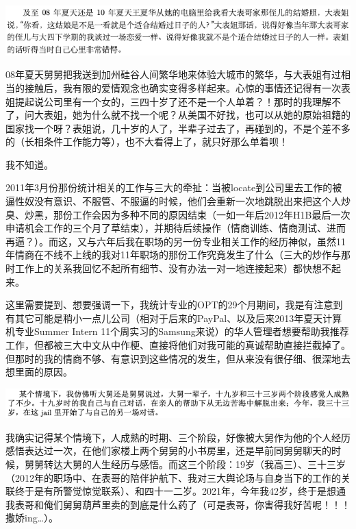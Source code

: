 \documentclass[9pt, b5paper]{article}
\begin{document}
\begin{center}
\includegraphics[width=.9\linewidth]{./pic/pfp53.png}
\end{center}

08年夏天舅舅把我送到加州硅谷人间繁华地来体验大城市的繁华，与大表姐有过相当的接触后，我有限的爱情观念也确实变得多样起来。心惊的事情还记得有一次表姐提起说公司里有一个女的，三四十岁了还不是一个人单着？！那时的我理解不了，问大表姐，她为什么就不找一个呢？从美国不好找，也可以从她的原始祖籍的国家找一个呀？表姐说，几十岁的人了，半辈子过去了，再碰到的，不是个差不多的（长相条件工作能力等），也不大看得上了，就只好那么单着呗！

我不知道。

2011年3月份那份统计相关的工作与三大的牵扯：当被locate到公司里去工作的被逼性奴没有意识、不服管、不服逼的时候，他们会重新一次地跳脱出来把这个人炒臭、炒黑，那份工作会因为多种不同的原因结束（一如一年后2012年H1B最后一次申请机会工作的三个月了草结束），并期待后续操作（情商训练、情商测试、进而再逼？）。而这，又与六年后我在职场的另一份专业相关工作的经历神似，虽然11年情商在不线不上线的我对11年职场的那份工作究竟发生了什么（三大的炒作与那时工作上的关系我回忆不起所有细节、没有办法一对一地连接起来）都快想不起来。 

这里需要提到、想要强调一下，我统计专业的OPT的29个月期间，我是有注意到有其它可能是稍小一点儿公司（相对于后来的PayPal、以及后来2013年夏天计算机专业Summer Intern 11个周实习的Samsung来说）的华人管理者想要帮助我推荐工作，但都被三大中文从中作梗、直接将他们对我可能的真诚帮助直接拦截掉了。但那时的我的情商不够、有意识到这些情况的发生，但从来没有很仔细、很深地去想里面的原因。 

\begin{center}
\includegraphics[width=.9\linewidth]{./pic/p1p133.png}
\end{center}

我确实记得某个情境下，人成熟的时期、三个阶段，好像被大舅作为他的个人经历感悟表达过一次，在他们家楼上两个舅舅的小书房里，还是早前同舅舅聊天的时候，舅舅转达大舅的人生经历与感悟。而这三个阶段：19岁（我高三）、三十三岁（2012年的职场中、在表哥的陪伴护航下、我对三大舆论场与自身当下的工作的关联终于是有所警觉惊觉联系）、和四十一二岁。2021年，今年我42岁，终于是想通我表哥和俺们舅舅葫芦里卖的到底是什么药了（可是表哥，你害得我好苦呢！！！撒娇ing\ldots{}）。
\end{document}
